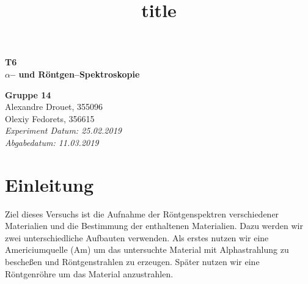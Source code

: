 \documentclass[a4paper,14pt]{article}
\title{\LARGE title}
\date{}
\newcommand{\skippage}{\clearpage{\thispagestyle{empty}\cleardoublepage}}
\begin{document}
	
\begin{titlepage}
	\thispagestyle{empty}
	
%
%
%
	
	\vspace{8cm}
	\begin{center}
		\hdashrule{\linewidth}{1pt}{}
		\vskip -0.25cm
		\hdashrule{\linewidth}{0.5pt}{}
		
		\vspace{0.5cm}
		\Huge{ \textbf{ T6 \\}}
		\LARGE{ \textbf{$\alpha$-- und R\"ontgen--Spektroskopie } } 
		
		\hdashrule{\linewidth}{0.5pt}{}
		\vskip -0.7cm
		\hdashrule{\linewidth}{1pt}{}
		
		\vspace{3cm}
		\Large{\textbf{ Gruppe 14 \\}}
		\Large{Alexandre Drouet, 355096 \\ Olexiy Fedorets, 356615 \\}
		\vspace{1cm}
		\Large{\textsl{ Experiment Datum: 25.02.2019 \\ Abgabedatum: 11.03.2019}}

	\end{center}
	\vfill
	
\end{titlepage}
	
	
	
\skippage
{}
\thispagestyle{plain}

\tableofcontents
\newpage
\thispagestyle{plain}
\listoffigures

\begingroup
\let\cleardoublepage\relax
\let\clearpage\relax
\listoftables
\endgroup



\setcounter{page}{1}
\restoregeometry
\thispagestyle{fancy}

	
\section{Einleitung}
Ziel dieses Versuchs ist die Aufnahme der Röntgenspektren verschiedener Materialien und die Bestimmung der enthaltenen Materialien. Dazu werden wir zwei unterschiedliche Aufbauten verwenden. Als erstes nutzen wir eine Americiumquelle (Am) um das untersuchte Material mit Alphastrahlung zu bescheßen und Röntgenstrahlen zu erzeugen. Später nutzen wir eine Röntgenröhre um das Material anzustrahlen.
\end{document}
